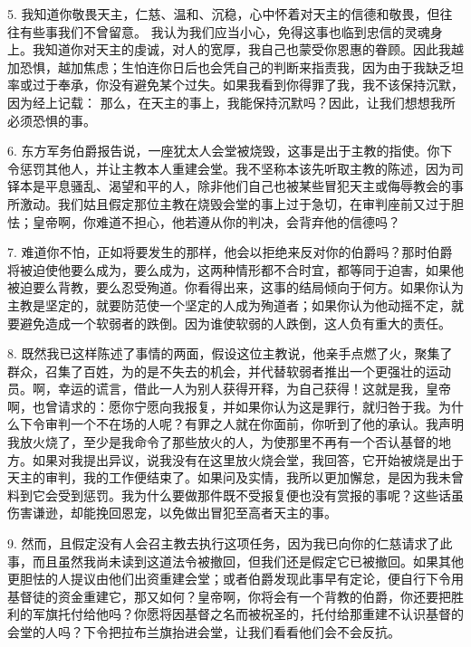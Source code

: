 5. 我知道你敬畏天主，仁慈、温和、沉稳，心中怀着对天主的信德和敬畏，但往往有些事我们不曾留意。  我认为我们应当小心，免得这事也临到忠信的灵魂身上。我知道你对天主的虔诚，对人的宽厚，我自己也蒙受你恩惠的眷顾。因此我越加恐惧，越加焦虑；生怕连你日后也会凭自己的判断来指责我，因为由于我缺乏坦率或过于奉承，你没有避免某个过失。如果我看到你得罪了我，我不该保持沉默，因为经上记载： 那么，在天主的事上，我能保持沉默吗？因此，让我们想想我所必须恐惧的事。\par

6. 东方军务伯爵报告说，一座犹太人会堂被烧毁，这事是出于主教的指使。你下令惩罚其他人，并让主教本人重建会堂。我不坚称本该先听取主教的陈述，因为司铎本是平息骚乱、渴望和平的人，除非他们自己也被某些冒犯天主或侮辱教会的事所激动。我们姑且假定那位主教在烧毁会堂的事上过于急切，在审判座前又过于胆怯；皇帝啊，你难道不担心，他若遵从你的判决，会背弃他的信德吗？\par

7. 难道你不怕，正如将要发生的那样，他会以拒绝来反对你的伯爵吗？那时伯爵将被迫使他要么成为，要么成为，这两种情形都不合时宜，都等同于迫害，如果他被迫要么背教，要么忍受殉道。你看得出来，这事的结局倾向于何方。如果你认为主教是坚定的，就要防范使一个坚定的人成为殉道者；如果你认为他动摇不定，就要避免造成一个软弱者的跌倒。因为谁使软弱的人跌倒，这人负有重大的责任。\par

8. 既然我已这样陈述了事情的两面，假设这位主教说，他亲手点燃了火，聚集了群众，召集了百姓，为的是不失去的机会，并代替软弱者推出一个更强壮的运动员。啊，幸运的谎言，借此一人为别人获得开释，为自己获得！这就是我，皇帝啊，也曾请求的：愿你宁愿向我报复，并如果你认为这是罪行，就归咎于我。为什么下令审判一个不在场的人呢？有罪之人就在你面前，你听到了他的承认。我声明我放火烧了，至少是我命令了那些放火的人，为使那里不再有一个否认基督的地方。如果对我提出异议，说我没有在这里放火烧会堂，我回答，它开始被烧是出于天主的审判，我的工作便结束了。如果问及实情，我所以更加懈怠，是因为我未曾料到它会受到惩罚。我为什么要做那件既不受报复便也没有赏报的事呢？这些话虽伤害谦逊，却能挽回恩宠，以免做出冒犯至高者天主的事。\par

9. 然而，且假定没有人会召主教去执行这项任务，因为我已向你的仁慈请求了此事，而且虽然我尚未读到这道法令被撤回，但我们还是假定它已被撤回。如果其他更胆怯的人提议由他们出资重建会堂；或者伯爵发现此事早有定论，便自行下令用基督徒的资金重建它，那又如何？皇帝啊，你将会有一个背教的伯爵，你还要把胜利的军旗托付给他吗？你愿将因基督之名而被祝圣的，托付给那重建不认识基督的会堂的人吗？下令把拉布兰旗抬进会堂，让我们看看他们会不会反抗。\par

